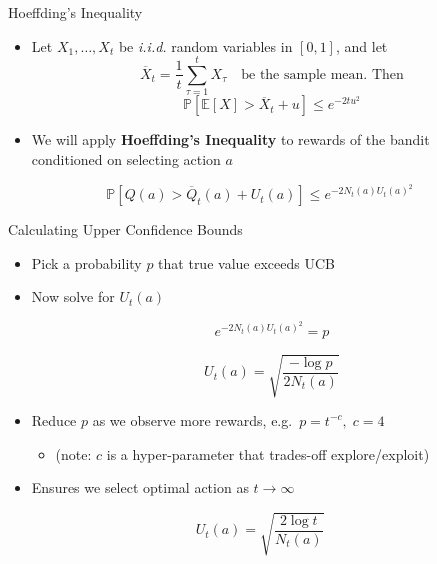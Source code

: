 \documentclass[11pt,table]{beamer}
\begin{document}
\begin{frame}{Hoeffding’s Inequality}
\begin{block}{}
\begin{itemize}
    \item Let $X_1, \ldots, X_t$ be \textit{i.i.d.} random variables in $[0,1]$, and let
    \[
    \overline{X}_t = \frac{1}{t} \sum_{\tau=1}^t X_\tau \quad \text{be the sample mean. Then}
    \]
    \[
    \mathbb{P} \left[ \mathbb{E}[X] > \overline{X}_t + u \right] \leq e^{-2tu^2}
    \]
\end{itemize}
\end{block}

    \begin{itemize}
        \item We will apply \textbf{Hoeffding’s Inequality} to rewards of the bandit\\
              conditioned on selecting action $a$
    \end{itemize}
    
\[
\mathbb{P} \left[ Q(a) > \overline{Q}_t(a) + U_t(a) \right] \leq e^{-2 N_t(a) U_t(a)^2}
\]

\end{frame}

\begin{frame}{Calculating Upper Confidence Bounds}
    \begin{itemize}
        \item Pick a probability $p$ that true value exceeds UCB
        \item Now solve for $U_t(a)$
				
\[
e^{-2 N_t(a) U_t(a)^2} = p
\]

\[
U_t(a) = \sqrt{ \frac{ -\log p }{ 2 N_t(a) } }
\]
\pause
        \item Reduce $p$ as we observe more rewards, e.g.\ $p = t^{-c}, \; c=4$
        \begin{itemize}
            \item (note: $c$ is a hyper-parameter that trades-off explore/exploit)
        \end{itemize}
        \item Ensures we select optimal action as $t \rightarrow \infty$
    \end{itemize}

\[
U_t(a) = \sqrt{ \frac{2 \log t}{N_t(a)} }
\]
\end{frame}
\end{document}
